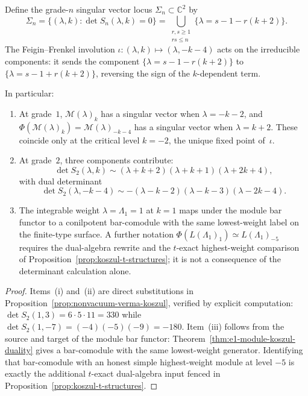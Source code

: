 \begin{corollary}
\label{cor:singular-vector-symmetry}
Define the grade-$n$ singular vector locus
$\Sigma_n \subset \mathbb{C}^2$ by
\[
\Sigma_n = \bigl\{(\lambda, k) :
\det S_n(\lambda, k) = 0 \bigr\}
= \bigcup_{\substack{r,s \geq 1 \\ rs \leq n}}
\bigl\{\lambda = s - 1 - r(k+2)\bigr\}.
\]
The Feigin--Frenkel involution
$\iota\colon (\lambda, k) \mapsto (\lambda, -k-4)$ acts on
the irreducible components: it sends the component
$\{\lambda = s - 1 - r(k+2)\}$ to
$\{\lambda = s - 1 + r(k+2)\}$, reversing the sign of the
$k$-dependent term.

In particular:
\begin{enumerate}[label=\textup{(\roman*)}]
\item At grade~$1$, $\mathcal{M}(\lambda)_k$ has a singular
 vector when $\lambda = -k - 2$, and
 $\Phi(\mathcal{M}(\lambda)_k) = \mathcal{M}(\lambda)_{-k-4}$
 has a singular vector when $\lambda = k + 2$. These coincide
 only at the critical level $k = -2$, the unique fixed point
 of~$\iota$.
\item At grade~$2$, three components contribute:
 \[
 \det S_2(\lambda, k) \sim
 (\lambda + k + 2)(\lambda + k + 1)(\lambda + 2k + 4),
 \]
 with dual determinant
 \[
 \det S_2(\lambda, -k\!-\!4) \sim
 -(\lambda - k - 2)(\lambda - k - 3)(\lambda - 2k - 4).
 \]
\item The integrable weight $\lambda = \Lambda_1 = 1$ at $k = 1$
 maps under the module bar functor to a conilpotent bar-comodule
 with the same lowest-weight label on the finite-type surface. A
 further notation
 $\Phi(L(\Lambda_1)_1)\simeq L(\Lambda_1)_{-5}$ requires the
 dual-algebra rewrite and the $t$-exact highest-weight comparison
 of Proposition~\ref{prop:koszul-t-structures}; it is not a
 consequence of the determinant calculation alone.
\end{enumerate}
\end{corollary}

\begin{proof}
Items~(i) and~(ii) are direct substitutions in
Proposition~\ref{prop:nonvacuum-verma-koszul}, verified
by explicit computation:
$\det S_2(1, 3) = 6 \cdot 5 \cdot 11 = 330$ while
$\det S_2(1, -7) = (-4)(-5)(-9) = -180$.
Item~(iii) follows from the source and target of the module bar
functor: Theorem~\ref{thm:e1-module-koszul-duality} gives a
bar-comodule with the same lowest-weight generator. Identifying that
bar-comodule with an honest simple highest-weight module at level
$-5$ is exactly the additional $t$-exact dual-algebra input fenced in
Proposition~\ref{prop:koszul-t-structures}.
\end{proof}

